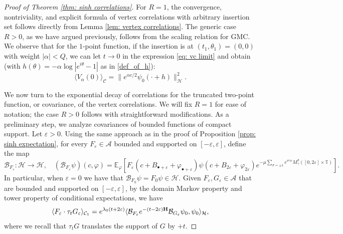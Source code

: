 \documentclass[10pt,a4paper]{amsart}
\def\T{\mathbb{T}}
\newcommand{\cjd}{\rangle}
\newcommand{\cjg}{\langle}
\def\eps{\varepsilon}
\newcommand{\mc}{\mathcal}
\begin{document}
\begin{proof}[Proof of Theorem \ref{thm: sinh correlations}]
For $R=1$, the convergence, nontriviality, and explicit formula of vertex correlations with arbitrary insertion set follows directly from Lemma \ref{lem: vertex correlations}. The generic case $R>0$, as we have argued previously, follows from the scaling relation for GMC. We observe that for the $1$-point function, if the insertion is at $(t_1,\theta_1)=(0,0)$ with weight $|\alpha|<Q$, we can let $t\to 0$ in the expression \eqref{eq: vc limit} and obtain (with $h(\theta)=-\alpha \log|e^{i\theta}-1|$ as in \eqref{def_of_h}):
\begin{equation}\label{1-point}
\cjg V_{\alpha}(0)\cjd_{\mc{C}}=  \|e^{\alpha c/2} \psi_0(\cdot + h)\|^2_{\mc{H}}.
\end{equation}


We now turn to the exponential decay of correlations for the truncated two-point function, or covariance, of the vertex correlations. We will fix $R=1$ for ease of notation; the case $R>0$ follows with straightforward modifications. As a preliminary step, we analyze covariances of bounded functions of compact support. Let $\eps > 0$. Using the same approach as in the proof of Proposition \ref{prop: sinh expectation}, for every $F_\eps \in \mathcal A$ bounded and supported on $[-\eps,\eps]$, define the map
\begin{equation}
\mc{B}_{F_\eps}:\mathcal H \rightarrow \mathcal H, \quad (\mc{B}_{F_\eps} \psi)(c,\varphi) = \mathbb E_\varphi[F_\eps(c+B_{\bullet +\eps} +\varphi_{\bullet +\eps}) \psi(c+B_{2\eps}+\varphi_{2\eps})e^{-\mu  \sum_{\sigma = \pm 1} e^{\sigma\gamma c}M_\gamma^\sigma([0,2\eps]\times\T)}].
\end{equation}
In particular, when $\eps = 0$ we have that $\mc{B}_{F_0}\psi = F_0 \psi  \in \mathcal {H}$. Given $F_\eps,G_\eps \in \mathcal A$ that are bounded and supported on $[-\eps,\eps]$, by the domain Markov property and tower property of conditional expectations, we have
\begin{equation}
\begin{split}
\langle F_\eps \cdot \tau_{t} G_\eps \rangle_{\mathcal C_1} =
 e^{\lambda_0 (t+2\eps)} \cjg \mc{B}_{F_\eps}e^{-(t-2\eps){\bf H}}\mc{B}_{G_\eps}\psi_0,\psi_0\cjd_{\mc{H}},
\end{split}
\end{equation}
where we recall that $\tau_t G$ translates the support of $G$ by $+t$. 


\end{proof}
\end{document}
